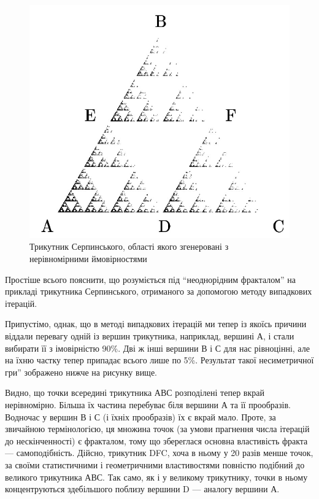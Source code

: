\documentclass[
  letterpaper,
]{report}
\begin{document}
\begin{figure}

{\centering 

\includegraphics{Images/lab_7/triangle.jpg}

}

\caption{\label{fig-triangle}Трикутник Серпинського, області якого
згенеровані з нерівномірними ймовірностями}

\end{figure}

Простіше всього пояснити, що розуміється під ``неоднорідним фракталом''
на прикладі трикутника Серпинського, отриманого за допомогою методу
випадкових ітерацій.

Припустімо, однак, що в методі випадкових ітерацій ми тепер із якоїсь
причини віддали перевагу одній із вершин трикутника, наприклад, вершині
А, і стали вибирати її з імовірністю 90\%. Дві ж інші вершини В і С для
нас рівноцінні, але на їхню частку тепер припадає всього лише по 5\%.
Результат такої несиметричної гри'' зображено нижче на рисунку вище.

Видно, що точки всередині трикутника АВС розподілені тепер вкрай
нерівномірно. Більша їх частина перебуває біля вершини А та її
прообразів. Водночас у вершин В і С (і їхніх прообразів) їх є вкрай
мало. Проте, за звичайною термінологією, ця множина точок (за умови
прагнення числа ітерацій до нескінченності) є фракталом, тому що
збереглася основна властивість фракта --- самоподібність. Дійсно,
трикутник DFC, хоча в ньому у 20 разів менше точок, за своїми
статистичними і геометричними властивостями повністю подібний до
великого трикутника АВС. Так само, як і у великому трикутнику, точки в
ньому концентруються здебільшого поблизу вершини D --- аналогу вершини
А.
\end{document}
